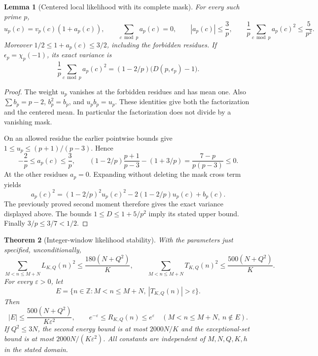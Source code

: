 \documentclass[11pt]{article}
\newtheorem{theorem}{Theorem}[section]
\newtheorem{lemma}[theorem]{Lemma}
\begin{document}
\begin{lemma}[Centered local likelihood with its complete mask]
\label{lem:integerLocalLikelihood}
For every such prime \(p\),
\[
 u_p(c)=v_p(c)(1+a_p(c)),\qquad
 \sum_{c\bmod p}a_p(c)=0,\qquad
 |a_p(c)|\leq\frac3p,\qquad
 \frac1p\sum_{c\bmod p}a_p(c)^2\leq\frac5{p^2}.
\]
Moreover \(1/2\leq1+a_p(c)\leq3/2\), including the forbidden residues.
If \(\epsilon_p=\chi_p(-1)\), its exact variance is
\[
 \frac1p\sum_{c\bmod p}a_p(c)^2
       =(1-2/p)\bigl(D(p,\epsilon_p)-1\bigr).
\]
\end{lemma}

\begin{proof}
The weight \(u_p\) vanishes at the forbidden residues and has mean one.
Also \(\sum b_p=p-2\), \(b_p^2=b_p\), and \(u_pb_p=u_p\).
These identities give both the factorization and the centered mean.
In particular the factorization does not divide by a vanishing mask.

On an allowed residue the earlier pointwise bounds give
\(1\leq u_p\leq(p+1)/(p-3)\). Hence
\[
 -\frac2p\leq a_p(c)\leq\frac3p,
 \qquad
 (1-2/p)\frac{p+1}{p-3}-(1+3/p)
             =\frac{7-p}{p(p-3)}\leq0.
\]
At the other residues \(a_p=0\). Expanding without deleting the mask
cross term yields
\[
 a_p(c)^2=(1-2/p)^2u_p(c)^2
                  -2(1-2/p)u_p(c)+b_p(c).
\]
The previously proved second moment therefore gives the exact variance
displayed above. The bounds \(1\leq D\leq1+5/p^2\) imply its stated
upper bound. Finally \(3/p\leq3/7<1/2\).
\end{proof}

\begin{theorem}[Integer-window likelihood stability]
\label{thm:integerTailStability}
With the parameters just specified, unconditionally,
\[
 \sum_{M<n\leq M+N}L_{K,Q}(n)^2
       \leq \frac{180(N+Q^2)}K,
 \qquad
 \sum_{M<n\leq M+N}T_{K,Q}(n)^2
       \leq \frac{500(N+Q^2)}K.
\]
For every \(\varepsilon>0\), let
\[
 E=\{n\in\mathbb Z:M<n\leq M+N,\ |T_{K,Q}(n)|>\varepsilon\}.
\]
Then
\[
 |E|\leq\frac{500(N+Q^2)}{K\varepsilon^2},
 \qquad
 e^{-\varepsilon}\leq R_{K,Q}(n)\leq e^\varepsilon
             \quad(M<n\leq M+N,\ n\notin E).
\]
If \(Q^2\leq3N\), the second energy bound is at most \(2000N/K\)
and the exceptional-set bound is at most \(2000N/(K\varepsilon^2)\).
All constants are independent of \(M,N,Q,K,h\) in the stated domain.
\end{theorem}
\end{document}
